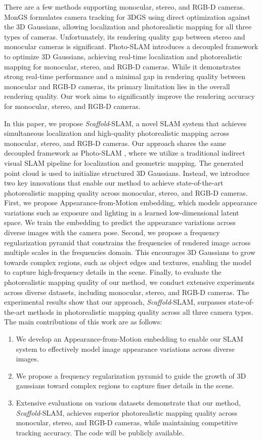 There are a few methods supporting monocular, stereo, and RGB-D cameras. MonGS \cite{MonoGS2024} formulates camera tracking for 3DGS using direct optimization against the 3D Gaussians, allowing localization and photorealistic mapping for all three types of cameras. Unfortunately, its rendering quality gap between stereo and monocular cameras is significant. Photo-SLAM \cite{Photo-SLAM2024} introduces a decoupled framework to optimize 3D Gaussians, achieving real-time localization and photorealistic mapping for monocular, stereo, and RGB-D cameras. While it demonstrates strong real-time performance and a minimal gap in rendering quality between monocular and RGB-D cameras, its primary  limitation lies in the overall rendering quality. Our work aims to significantly improve the rendering accuracy for monocular, stereo, and RGB-D cameras.

In this paper, we propose \emph{Scaffold}-SLAM, a novel SLAM system that achieves simultaneous localization and high-quality photorealistic mapping across monocular, stereo, and RGB-D cameras. Our approach shares the same decoupled framework as Photo-SLAM \cite{Photo-SLAM2024}, where we utilize a traditional indirect visual SLAM pipeline for localization and geometric mapping. The generated point cloud is used to initialize structured 3D Gaussians. Instead, we introduce two key innovations that enable our method to achieve state-of-the-art photorealistic mapping quality across monocular, stereo, and RGB-D cameras. First, we propose Appearance-from-Motion embedding, which models appearance variations such as exposure and lighting in a learned low-dimensional latent space. We train the embedding to predict the appearance variations across diverse images with the camera pose. Second, we propose a frequency regularization pyramid that constrains the frequencies of rendered image across multiple scales in the frequencies domain. This encourages 3D Gaussians to grow towards complex regions, such as object edges and textures, enabling the model to capture high-frequency details in the scene. Finally, to evaluate the photorealistic mapping quality of our method, we conduct extensive experiments across diverse datasets, including monocular, stereo, and RGB-D cameras. The experimental results show that our approach, \emph{Scaffold}-SLAM, surpasses state-of-the-art methods in photorealistic mapping quality across all three camera types. The main contributions of this work are as follows:
\begin{enumerate}
    \item We develop an Appearance-from-Motion embedding to enable our SLAM system to effectively model image appearance variations across diverse images.
    \item We propose a frequency regularization pyramid  to guide the growth
    of 3D gaussians toward complex regions to capture finer details in the scene.
    \item Extensive evaluations on various datasets demonstrate that our method, \emph{Scaffold}-SLAM, achieves superior photorealistic mapping quality across monocular, stereo, and RGB-D cameras, while maintaining competitive tracking accuracy. The code will be publicly available.
\end{enumerate}

